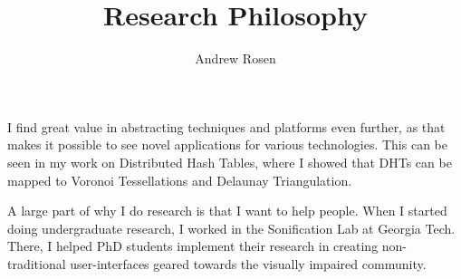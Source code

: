 \documentclass[10pt, a4paper]{article}
\author{Andrew Rosen}
\title{Research Philosophy}
\date{}
\begin{document}
\maketitle


I find great value in abstracting techniques and platforms even further, as that makes it possible to see novel applications for various technologies.  
This can be seen in my work on Distributed Hash Tables, where I showed that DHTs can be mapped to Voronoi Tessellations and Delaunay Triangulation.


A large part of why I do research is that I want to help people.
When I started doing undergraduate research, I worked in the Sonification Lab at Georgia Tech.
There, I helped PhD students implement their research in creating  non-traditional user-interfaces geared towards the visually impaired community.
\end{document}
